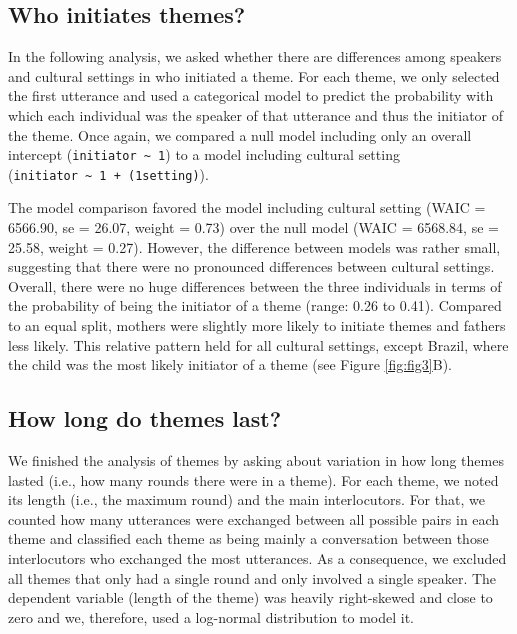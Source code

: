 \documentclass[
  man,floatsintext]{apa6}
\begin{document}
\hypertarget{who-initiates-themes}{%
\subsection{Who initiates themes?}\label{who-initiates-themes}}

In the following analysis, we asked whether there are differences among speakers and cultural settings in who initiated a theme. For each theme, we only selected the first utterance and used a categorical model to predict the probability with which each individual was the speaker of that utterance and thus the initiator of the theme. Once again, we compared a null model including only an overall intercept (\texttt{initiator\ \textasciitilde{}\ 1}) to a model including cultural setting (\texttt{initiator\ \textasciitilde{}\ 1\ +\ (1\textbar{}setting)}).

The model comparison favored the model including cultural setting (WAIC = 6566.90, se = 26.07, weight = 0.73) over the null model (WAIC = 6568.84, se = 25.58, weight = 0.27). However, the difference between models was rather small, suggesting that there were no pronounced differences between cultural settings. Overall, there were no huge differences between the three individuals in terms of the probability of being the initiator of a theme (range: 0.26 to 0.41). Compared to an equal split, mothers were slightly more likely to initiate themes and fathers less likely. This relative pattern held for all cultural settings, except Brazil, where the child was the most likely initiator of a theme (see Figure \ref{fig:fig3}B).

\hypertarget{how-long-do-themes-last}{%
\subsection{How long do themes last?}\label{how-long-do-themes-last}}

We finished the analysis of themes by asking about variation in how long themes lasted (i.e., how many rounds there were in a theme). For each theme, we noted its length (i.e., the maximum round) and the main interlocutors. For that, we counted how many utterances were exchanged between all possible pairs in each theme and classified each theme as being mainly a conversation between those interlocutors who exchanged the most utterances. As a consequence, we excluded all themes that only had a single round and only involved a single speaker. The dependent variable (length of the theme) was heavily right-skewed and close to zero and we, therefore, used a log-normal distribution to model it.
\end{document}
